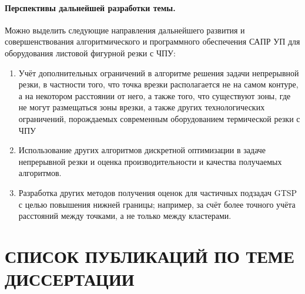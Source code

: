 \documentclass[14pt]{extarticle}
\begin{document}
\paragraph*{Перспективы дальнейшей разработки темы.}
Можно выделить следующие направления дальнейшего развития и совершенствования алгоритмического и
программного обеспечения САПР УП для оборудования листовой фигурной резки с ЧПУ:

\begin{enumerate}
    \item 
    Учёт дополнительных ограничений в алгоритме решения задачи
    непрерывной резки, в частности того, 
    что точка врезки располагается не на самом контуре,
    а на некотором расстоянии от него, а также того, что
    существуют зоны, где не могут размещаться зоны врезки,
    а также других технологических ограничений,
    порождаемых современным оборудованием термической резки с ЧПУ
    \item 
    Использование других алгоритмов дискретной оптимизации в задаче
    непрерывной резки и оценка производительности и качества получаемых 
    алгоритмов.
    \item 
    Разработка других методов получения оценок для частичных подзадач GTSP
    с целью повышения нижней границы; 
    например, за счёт более точного учёта расстояний между точками,
    а не только между кластерами.
\end{enumerate}
\section*{СПИСОК ПУБЛИКАЦИЙ ПО ТЕМЕ ДИССЕРТАЦИИ}
\end{document}
